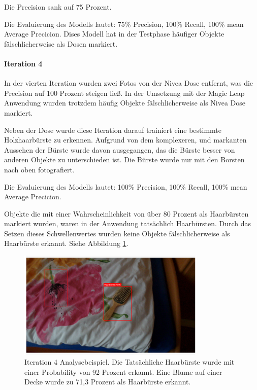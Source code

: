 Die Precision sank auf 75 Prozent.

Die Evaluierung des Modells lautet: 75\% Precision, 100\% Recall, 100\% mean Average Precicion.
Dises Modell hat in der Testphase häufiger Objekte fälschlicherweise als Dosen markiert.

\paragraph{Iteration 4}

In der vierten Iteration wurden zwei Fotos von der Nivea Dose entfernt, was die Precision auf 100 Prozent steigen ließ. In der Umsetzung mit der Magic Leap Anwendung wurden trotzdem häufig Objekte fälschlicherweise als Nivea Dose markiert.

Neben der Dose wurde diese Iteration darauf trainiert eine bestimmte Holzhaarbürste zu erkennen. Aufgrund von dem komplexeren, und markanten Aussehen der Bürste wurde davon ausgegangen, das die Bürste besser von anderen Objekte zu unterschieden ist. 
Die Bürste wurde nur mit den Borsten nach oben fotografiert.

Die Evaluierung des Modells lautet: 100\% Precision, 100\% Recall, 100\% mean Average Precicion.

Objekte die mit einer Wahrscheinlichkeit von über 80 Prozent als Haarbürsten markiert wurden, waren in der Anwendung tatsächlich Haarbürsten. Durch das Setzen dieses Schwellenwertes wurden keine Objekte fälschlicherweise als Haarbürste erkannt. Siehe Abbildung \ref{img:it4}.

\begin{figure}[H]
	\centering
	\includegraphics[width=0.8\textwidth]{images/it4notpretty.png}
	\caption[Iteration 4 Analysebeispiel]{Iteration 4 Analysebeispiel. Die Tatsächliche Haarbürste wurde mit einer Probability von 92 Prozent erkannt. Eine Blume auf einer Decke wurde zu 71,3 Prozent als Haarbürste erkannt.}
	\label{img:it4}
\end{figure}

